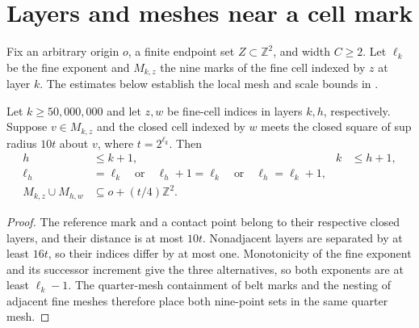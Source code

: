 \section{Layers and meshes near a cell mark}
\label{sec:area_law_near_mark_geometry}

Fix an arbitrary origin $o$, a finite endpoint set $Z\subset\mathbb Z^2$,
and width $C\ge 2$. Let $\ell_k$ be the fine exponent and
$M_{k,z}$ the nine marks of the fine cell indexed by $z$ at
layer $k$. The estimates below establish the local mesh and scale bounds in
\cite[Section~11]{OpenAI2026AreaLaw}.


\begin{lemma}
    \label{thm:area_law_near_mark_quarter_mesh}
    \leanok
    Let $k\ge 50{,}000{,}000$ and let $z,w$ be fine-cell indices
    in layers $k,h$, respectively. Suppose $v\in M_{k,z}$ and the closed
    cell indexed by $w$ meets the closed square of sup radius $10t$
    about $v$, where $t=2^{\ell_k}$. Then
    \begin{align}
        h                   & \le k+1,                                  & k & \le h+1, \\
        \ell_h              & =\ell_k\quad\text{or}\quad\ell_h+1=\ell_k
        \quad\text{or}\quad\ell_h=\ell_k+1,                                            \\
        M_{k,z}\cup M_{h,w} & \subseteq o+(t/4)\mathbb Z^2.
    \end{align}
\end{lemma}
\begin{proof}\leanok
    The reference mark and a contact point belong to their respective
    closed layers, and their distance is at most $10t$.
    Nonadjacent layers are separated by at least $16t$, so their
    indices differ by at most one. Monotonicity of the fine exponent
    and its successor increment give the three alternatives, so both
    exponents are at least $\ell_k-1$.
    The quarter-mesh containment of belt marks and the nesting of
    adjacent fine meshes therefore place both
    nine-point sets in the same quarter mesh.
\end{proof}


